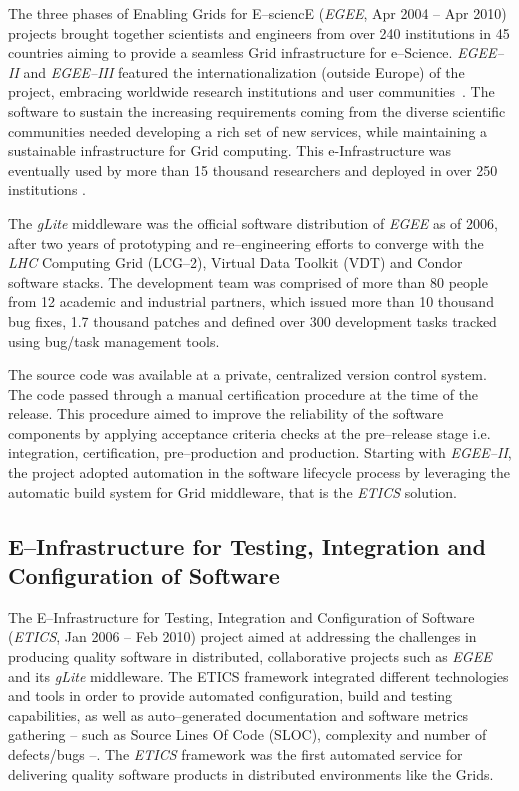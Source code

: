The three phases of Enabling Grids for E--sciencE ({\sl EGEE}, Apr 2004 -- Apr 2010)
\cite{cordis:egee,cordis:egee2,cordis:egee3} projects brought together
scientists and engineers from over 240 institutions in 45 countries aiming to
provide a seamless Grid infrastructure for e--Science. {\sl EGEE--II} and {\sl EGEE--III}
featured the internationalization (outside Europe) of the project, embracing worldwide research
institutions and user communities~\cite{egee}. The software to sustain the increasing
requirements coming from the diverse scientific communities needed developing a
rich set of new services, while maintaining a sustainable infrastructure for
Grid computing. This e-Infrastructure was eventually used by more than 15 thousand researchers
and deployed in over 250 institutions \cite{ferrari2011resources}.

The {\sl gLite} middleware \cite{glite} was the
official software distribution of {\sl EGEE} as of 2006, after two years of prototyping and
re--engineering efforts to converge with the {\sl LHC} Computing Grid (LCG--2), Virtual
Data Toolkit (VDT) and Condor \cite{condor} software stacks. The
development team was comprised of more than 80 people from 12 academic and
industrial partners, which issued more than 10 thousand bug fixes, 1.7 thousand patches and
defined over 300 development tasks tracked using bug/task management tools.

The source code was available at a private, centralized version control system.
The code passed through a manual certification procedure at the time of the release.
This procedure aimed to improve the reliability of the software components by applying
acceptance criteria checks at the pre--release stage
\cite{egee:acceptance-criteria} i.e. integration, certification, pre--production and
production. Starting with {\sl EGEE--II}, the project adopted automation in the software
lifecycle process by leveraging the automatic build system for Grid middleware, that is
the {\sl ETICS} \cite{etics} solution.

\subsection{E--Infrastructure for Testing, Integration and Configuration of Software}

The E--Infrastructure for Testing, Integration and Configuration of Software~\cite{etics}
({\sl ETICS}, Jan 2006 -- Feb 2010) project aimed
at addressing the challenges in producing quality software in distributed,
collaborative projects such as {\sl EGEE} and its {\sl gLite} middleware. The ETICS framework
integrated different technologies and tools in order to provide automated configuration,
build and testing capabilities, as well as auto--generated documentation and
software metrics gathering -- such as Source Lines Of Code (SLOC), complexity and
number of defects/bugs \cite{etics} --. The {\sl ETICS} framework was the first automated
service for delivering quality software products in distributed environments like
the Grids.


